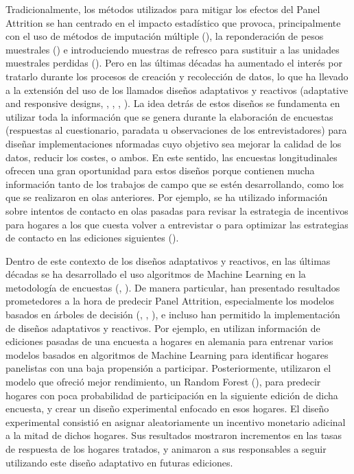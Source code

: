 Tradicionalmente, los métodos utilizados para mitigar los efectos del Panel Attrition se han centrado en el impacto estadístico que provoca, principalmente con el uso de métodos de imputación múltiple (\cite{rubin1987multiple}), la reponderación de pesos muestrales (\cite{groves2009survey}) e introduciendo muestras de refresco para sustituir a las unidades muestrales perdidas (\cite{hirano1998combining}). Pero en las últimas décadas ha aumentado el interés por tratarlo durante los procesos de creación y recolección de datos, lo que ha llevado a la extensión del uso de los llamados diseños adaptativos y reactivos (adaptative and responsive designs, \cite{groves2006responsive}, \cite{wagner2008adaptive}, \cite{schouten2017adaptive}, \cite{tourangeau2017adaptive}). La idea detrás de estos diseños se fundamenta en utilizar toda la información que se genera durante la elaboración de encuestas (respuestas al cuestionario, paradata u observaciones de los entrevistadores) para diseñar implementaciones nformadas cuyo objetivo sea mejorar la calidad de los datos, reducir los costes, o ambos. En este sentido, las encuestas longitudinales ofrecen una gran oportunidad para estos diseños porque contienen mucha información tanto de los trabajos de campo que se estén desarrollando, como los que se realizaron en olas anteriores. Por ejemplo, se ha utilizado información sobre intentos de contacto en olas pasadas para revisar la estrategia de incentivos para hogares a los que cuesta volver a entrevistar \cite{mcgonagle2022effects} o para optimizar las estrategias de contacto en las ediciones siguientes (\cite{kreuter2015note}).

Dentro de este contexto de los diseños adaptativos y reactivos, en las últimas décadas se ha desarrollado el uso algoritmos de Machine Learning en la metodología de encuestas (\cite{buskirk2018introduction}, \cite{kern2019tree}). De manera particular, han presentado resultados prometedores a la hora de predecir Panel Attrition, especialmente los modelos basados en árboles de decisión (\cite{kern2019tree}, \cite{kern2021predicting}, \cite{liu2020using}), e incluso han permitido la implementación de diseños adaptativos y reactivos. Por ejemplo, en \cite{beste2023case} utilizan información de ediciones pasadas de una encuesta a hogares en alemania para entrenar varios modelos basados en algoritmos de Machine Learning para identificar hogares panelistas con una baja propensión a participar. Posteriormente, utilizaron el modelo que ofreció mejor rendimiento, un Random Forest (\cite{breiman2001random}), para predecir hogares con poca probabilidad de participación en la siguiente edición de dicha encuesta, y crear un diseño experimental enfocado en esos hogares. El diseño experimental consistió en asignar aleatoriamente un incentivo monetario adicinal a la mitad de dichos hogares. Sus resultados mostraron incrementos en las tasas de respuesta de los hogares tratados, y animaron a sus responsables a seguir utilizando este diseño adaptativo en futuras ediciones.

